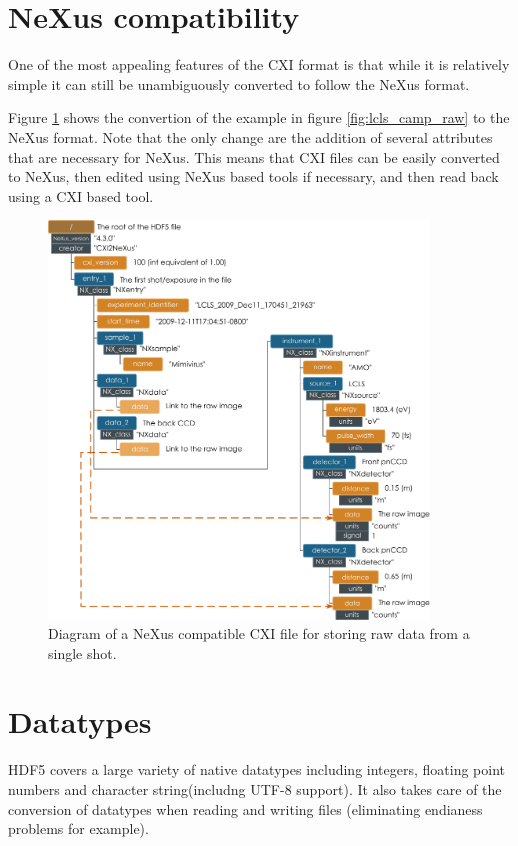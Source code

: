 \documentclass[usletter,11pt]{article}
\begin{document}
\clearpage
\section{NeXus compatibility}
One of the most appealing features of the CXI format is that while it is relatively simple it can still be unambiguously converted to follow the NeXus format.

Figure \ref{fig:lcls_camp_raw_nexus} shows the convertion of the example in figure \ref{fig:lcls_camp_raw} to the NeXus format. Note that the only change are the addition of several attributes that are necessary for NeXus. This means that CXI files can be easily converted to NeXus, then edited using NeXus based tools if necessary, and then read back using a CXI based tool.

\begin{figure}[h!]
\centering
\includegraphics[width=0.9\textwidth]{lcls_camp_cxi_nexus.pdf}
\caption{Diagram of a NeXus compatible CXI file for storing raw data from a single shot.}
\label{fig:lcls_camp_raw_nexus}
\end{figure}


\clearpage
\section{Datatypes}

HDF5 covers a large variety of native datatypes including integers,
floating point numbers and character string(includng UTF-8
support). It also takes care of the conversion of datatypes when
reading and writing files (eliminating endianess problems for
example). 
\end{document}
